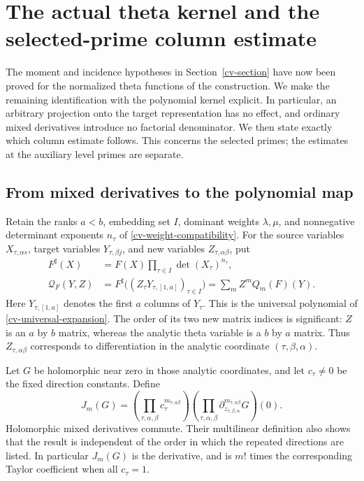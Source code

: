 \section{The actual theta kernel and the selected-prime column estimate}
\label{tvc-section}

The moment and incidence hypotheses in Section~\ref{cv-section}
have now been proved for the normalized theta functions of the
construction. We make the remaining identification with the
polynomial kernel explicit. In particular, an arbitrary projection
onto the target representation has no effect, and ordinary mixed
derivatives introduce no factorial denominator. We then state exactly
which column estimate follows. This concerns the selected primes;
the estimates at the auxiliary level primes are separate.
\cite{alpo-uniform-source}

\subsection{From mixed derivatives to the polynomial map}

Retain the ranks $a<b$, embedding set $I$, dominant weights
$\lambda,\mu$, and nonnegative determinant exponents $n_\tau$
of \eqref{cv-weight-compatibility}. For the source variables
$X_{\tau,\alpha s}$, target variables $Y_{\tau,\beta j}$,
and new variables $Z_{\tau,\alpha\beta}$, put
\[
 \begin{split}
 F^\sharp(X)&=F(X)\prod_{\tau\in I}\det(X_\tau)^{n_\tau},\\
 \mathcal Q_F(Y,Z)
   &=F^\sharp\bigl((Z_\tau Y_{\tau,[1,a]})_{\tau\in I}\bigr)
     =\sum_m Z^m Q_m(F)(Y).
 \end{split}
                                                               \tag{TC1}
\]
Here $Y_{\tau,[1,a]}$ denotes the first $a$ columns of $Y_\tau$.
This is the universal polynomial of
\eqref{cv-universal-expansion}. The order of its two new matrix
indices is significant: $Z$ is an $a$ by $b$ matrix, whereas
the analytic theta variable is a $b$ by $a$ matrix. Thus
$Z_{\tau,\alpha\beta}$ corresponds to differentiation in
the analytic coordinate $(\tau,\beta,\alpha)$.

Let $G$ be holomorphic near zero in those analytic coordinates,
and let $c_\tau\ne0$ be the fixed direction constants. Define
\[
 J_m(G)=
  \left(\prod_{\tau,\alpha,\beta}
                  c_\tau^{m_{\tau,\alpha\beta}}\right)
  \left(\prod_{\tau,\alpha,\beta}
   \partial_{z_{\tau,\beta,\alpha}}^{m_{\tau,\alpha\beta}}
          G\right)(0).
                                                               \tag{TC2}
\]
Holomorphic mixed derivatives commute. Their multilinear definition
also shows that the result is independent of the order in which the
repeated directions are listed. In particular $J_m(G)$ is the
derivative, and is $m!$ times the corresponding Taylor coefficient
when all $c_\tau=1$.

